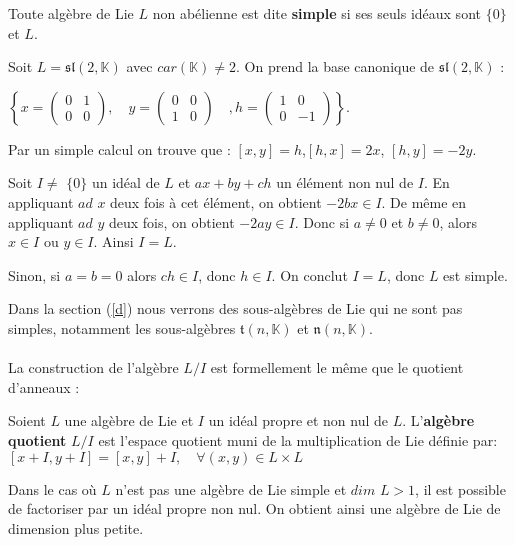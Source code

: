 \documentclass[a4paper,openany,12pt]{report}
\newcommand{\KK}{\mathbb{K}}
\newcommand{\ssl}{\mathfrak{sl}}
\newcommand{\ttt}{\mathfrak{t}}
\newcommand{\nn}{\mathfrak{n}}
\theoremstyle{break}
{\theorembodyfont{\upshape}
\newtheorem*{rmq}{Remarque :}
\newtheorem*{prv}{Preuve :}
\newtheorem*{ex}{Exemples :}
\newtheorem*{exe}{Exemple : }
\newtheorem*{nota}{Notation :}
\newtheorem*{dem}{D\'emonstration :}}
\begin{document}
\begin{df}
\quad Toute algèbre de Lie $L$ non abélienne est dite \textbf{simple} si ses seuls idéaux sont $\{ 0 \}$ et $L$.
\end{df}

\begin{exe}
\quad Soit $L = \ssl(2,\KK)$ avec $car(\KK)\ne 2$. On prend la base canonique de $\ssl(2,\KK)$ : 
\begin{center}
$\left \{ x=\begin{pmatrix} 0 & 1\\ 0 & 0 \end{pmatrix},\quad y=\begin{pmatrix} 0 & 0\\ 1 & 0 \end{pmatrix}\quad, h=\begin{pmatrix} 1 & 0\\ 0 & -1 \end{pmatrix} \right \}$.
\end{center} 

Par un simple calcul on trouve que : $[x,y]=h$,\quad $[h,x]=2x$, \quad $[h,y]=-2y$.

Soit $I \ne$ $\{0 \}$ un idéal de $L$ et $ax+by+ch$ un élément non nul de $I$. En appliquant  $ad$ $x$ deux fois à cet élément, on obtient $-2bx\in I$. De même en appliquant $ad$ $y$ deux fois, on obtient $-2ay \in I$. Donc si $a \ne 0$ et $b \ne 0$, alors $x \in I $ ou $y \in I$. Ainsi $I=L$.

Sinon, si $a = b = 0$ alors $ch \in I$, donc $h \in I$. On conclut $I=L$, donc $L$ est simple.
\end{exe}

Dans la section (\ref{d}) nous verrons des sous-algèbres de Lie qui ne sont pas simples, notamment les sous-algèbres $\ttt(n,\KK)$ et $\nn(n,\KK)$.\\
\\

La construction de l'algèbre $L / I$ est formellement le même que le quotient d'anneaux :

\begin{df}
\quad Soient $L$ une algèbre de Lie et $I$ un idéal propre et non nul de $L$. L'\textbf{algèbre quotient} $L/I$ est l'espace quotient muni de la multiplication de Lie définie par:
\center $[x+I, y+I]=[x, y]+I, \quad \forall(x, y) \in L \times L$
\end{df}

\begin{rmq}
\quad Dans le cas où $L$ n'est pas une algèbre de Lie simple et $dim$ $L > 1$, il est possible de factoriser par un idéal propre non nul. On obtient ainsi une algèbre de Lie de dimension plus petite.
\end{rmq}
\end{document}
